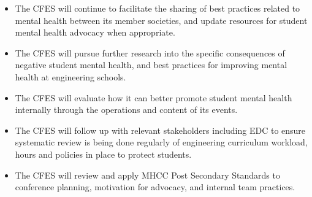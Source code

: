 \begin{itemize}
 \item The CFES will continue to facilitate the sharing of best practices related to mental health between its member societies, and update resources for student mental health advocacy when appropriate.
 \item The CFES will pursue further research into the specific consequences of negative student mental health, and best practices for improving mental health at engineering schools.
 \item The CFES will evaluate how it can better promote student mental health internally through the operations and content of its events.
 \item The CFES will follow up with relevant stakeholders including EDC to ensure systematic review is being done regularly of engineering curriculum workload, hours and policies in place to protect students.
 \item The CFES will review and apply MHCC Post Secondary Standards to conference planning, motivation for advocacy, and internal team practices.
\end{itemize}

\newpage
